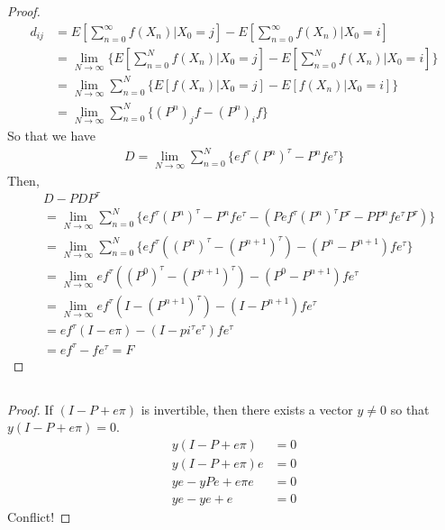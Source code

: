 \documentclass[runningheads]{llncs}
\begin{document}
    \subsection{}
    \begin{proof}
        \begin{align}
            d_{ij} &= E [ \sum_{n=0}^\infty f (X_n) | X_0 = j ] - E [ \sum_{n=0}^\infty f (X_n) | X_0 = i ] \\
            &= \mathop{\lim}_{N \rightarrow \infty} \{ E [ \sum_{n=0}^N f (X_n) | X_0 = j ] - E [ \sum_{n=0}^N f (X_n) | X_0 = i ] \} \\
            &= \mathop{\lim}_{N \rightarrow \infty} \sum_{n=0}^N \{ E [ f (X_n) | X_0 = j ] - E [ f (X_n) | X_0 = i ] \} \\
            &= \mathop{\lim}_{N \rightarrow \infty} \sum_{n=0}^N \{ (P^n)_j f - (P^n)_i f \} 
        \end{align}
        So that we have
        \begin{align}
            D = \mathop{\lim}_{N \rightarrow \infty} \sum_{n=0}^N \{ ef^\tau (P^n)^\tau - P^n f e^\tau \}
        \end{align}
        Then,
        \begin{align}
            &D - PDP^\tau \\
            &= \mathop{\lim}_{N \rightarrow \infty} \sum_{n=0}^N  \{ ef^\tau (P^n)^\tau - P^n f e^\tau - (Pef^\tau (P^n)^\tau P^\tau - PP^n f e^\tau P^\tau ) \} \\
            &= \mathop{\lim}_{N \rightarrow \infty} \sum_{n=0}^N  \{ ef^\tau ((P^n)^\tau - (P^{n+1})^\tau) - (P^n - P^{n+1}) fe^\tau \} \\
            &= \mathop{\lim}_{N \rightarrow \infty} ef^\tau ((P^0)^\tau - (P^{n+1})^\tau) - (P^0 - P^{n+1}) fe^\tau  \\
            &= \mathop{\lim}_{N \rightarrow \infty} ef^\tau (I - (P^{n+1})^\tau) - (I - P^{n+1}) fe^\tau \\
            &= ef^\tau (I - e \pi) - (I - pi^\tau e^\tau) fe^\tau \\
            &= ef^\tau - fe^\tau = F
        \end{align}
    \end{proof}
    \subsection{}
    \begin{proof}
        If $(I - P + e\pi)$ is invertible, then there exists a vector $y \neq 0$ so that
        $y (I - P + e\pi) = 0$.
        \begin{align}
            y(I - P + e\pi) &= 0 \\
            y(I - P + e\pi)e &= 0 \\
            ye - yPe + e\pi e &= 0 \\
            ye - ye + e &= 0
        \end{align}
        Conflict!
    \end{proof}
\end{document}
